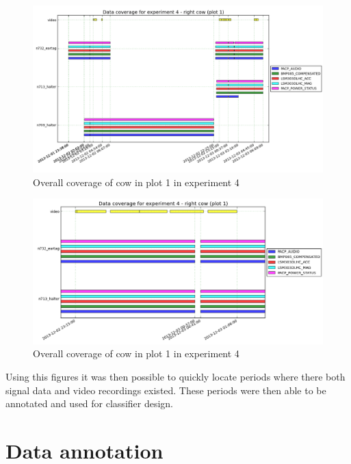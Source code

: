 \begin{figure}[ht!]
\begin{center}
\leavevmode
\includegraphics[width=1\textwidth]{images/experiment4_coverage_overall.png}
\end{center}
\caption{Overall coverage of cow in plot 1 in experiment 4}
\label{coverage_plot}
\end{figure}

\begin{figure}[ht!]
\begin{center}
\leavevmode
\includegraphics[width=1\textwidth]{images/experiment4_coverage_zoomed.png}
\end{center}
\caption{Overall coverage of cow in plot 1 in experiment 4}
\label{exp4overall}
\end{figure}

Using this figures it was then possible to quickly locate periods where there both signal data and video recordings existed. These periods were then able to be annotated and used for classifier design. 


\section{Data annotation}

